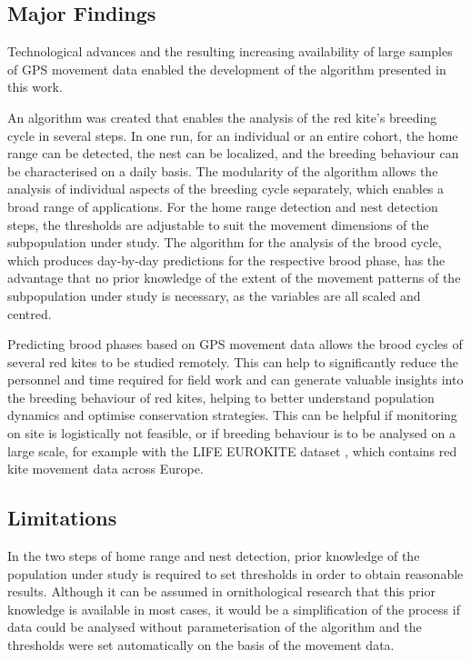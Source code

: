 \subsection{Major Findings}
Technological advances and the resulting increasing availability of large samples of GPS movement data enabled the development of the algorithm presented in this work.

An algorithm was created that enables the analysis of the red kite's breeding cycle in several steps. In one run, for an individual or an entire cohort, the home range can be detected, the nest can be localized, and the breeding behaviour can be characterised on a daily basis. The modularity of the algorithm allows the analysis of individual aspects of the breeding cycle separately, which enables a broad range of applications. For the home range detection and nest detection steps, the thresholds are adjustable to suit the movement dimensions of the subpopulation under study. The algorithm for the analysis of the brood cycle, which produces day-by-day predictions for the respective brood phase, has the advantage that no prior knowledge of the extent of the movement patterns of the subpopulation under study is necessary, as the variables are all scaled and centred.

Predicting brood phases based on GPS movement data allows the brood cycles of several red kites to be studied remotely. This can help to significantly reduce the personnel and time required for field work and can generate valuable insights into the breeding behaviour of red kites, helping to better understand population dynamics and optimise conservation strategies. This can be helpful if monitoring on site is logistically not feasible, or if breeding behaviour is to be analysed on a large scale, for example with the LIFE EUROKITE dataset \parencite{lifeeurokiteproject}, which contains red kite movement data across Europe.

\subsection{Limitations}
In the two steps of home range and nest detection, prior knowledge of the population under study is required to set thresholds in order to obtain reasonable results. Although it can be assumed in ornithological research that this prior knowledge is available in most cases, it would be a simplification of the process if data could be analysed without parameterisation of the algorithm and the thresholds were set automatically on the basis of the movement data.

